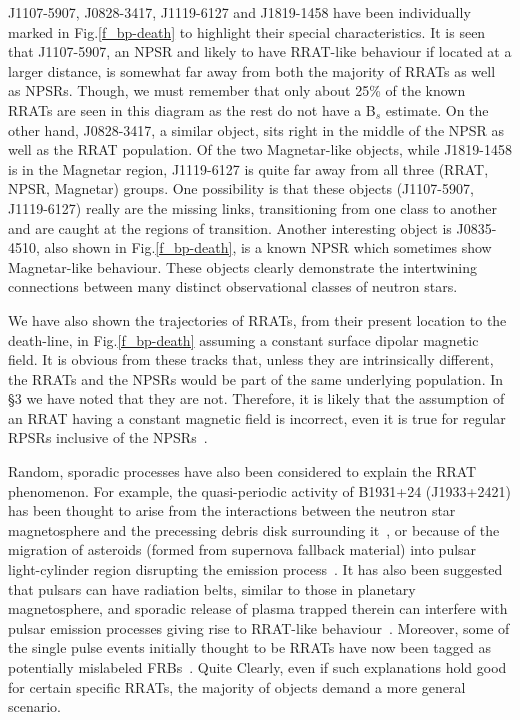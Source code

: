 \documentclass{jaa}
\begin{document}
J1107-5907,   J0828-3417,   J1119-6127   and  J1819-1458   have   been
individually marked in Fig.\ref{f_bp-death} to highlight their special
characteristics. It  is seen  that J1107-5907, an  NPSR and  likely to
have RRAT-like behaviour if located  at a larger distance, is somewhat
far away from both the majority of  RRATs as well as NPSRs. Though, we
must remember that only about 25\% of the known RRATs are seen in this
diagram as the rest do not have  a B$_s$ estimate.  On the other hand,
J0828-3417, a similar object, sits right  in the middle of the NPSR as
well as the  RRAT population. Of the two  Magnetar-like objects, while
J1819-1458 is  in the  Magnetar region, J1119-6127  is quite  far away
from all three (RRAT, NPSR, Magnetar) groups.  One possibility is that
these objects  (J1107-5907, J1119-6127) really are  the missing links,
transitioning from one class to another  and are caught at the regions
of transition. Another interesting object is J0835-4510, also shown in
Fig.\ref{f_bp-death},   is  a   known   NPSR   which  sometimes   show
Magnetar-like  behaviour.   These   objects  clearly  demonstrate  the
intertwining connections  between many distinct  observational classes
of neutron stars.

We  have also  shown the  trajectories  of RRATs,  from their  present
location  to  the  death-line,   in  Fig.\ref{f_bp-death}  assuming  a
constant surface  dipolar magnetic  field.  It  is obvious  from these
tracks that,  unless they are  intrinsically different, the  RRATs and
the NPSRs would  be part of the same underlying  population. In \S3 we
have  noted that  they  are  not. Therefore,  it  is  likely that  the
assumption of an RRAT having a constant magnetic  field is incorrect,
even   it   is    true   for   regular   RPSRs    inclusive   of   the
NPSRs~\cite{bhatt92,konar97a}.

Random, sporadic  processes have also  been considered to  explain the
RRAT phenomenon. For example,  the quasi-periodic activity of B1931+24
(J1933+2421) has been  thought to arise from  the interactions between
the  neutron  star  magnetosphere   and  the  precessing  debris  disk
surrounding it~\cite{li06},  or because of the  migration of asteroids
(formed from  supernova fallback material) into  pulsar light-cylinder
region disrupting  the emission  process~\cite{corde08}.  It  has also
been suggested that pulsars can have radiation belts, similar to those
in  planetary magnetosphere,  and sporadic  release of  plasma trapped
therein can  interfere with pulsar  emission processes giving  rise to
RRAT-like behaviour~\cite{luo07}.  Moreover, some  of the single pulse
events  initially  thought  to  be  RRATs  have  now  been  tagged  as
potentially  mislabeled FRBs~\cite{keane16}.  Quite  Clearly, even  if
such explanations hold  good for certain specific  RRATs, the majority
of objects demand a more general scenario.
\end{document}
